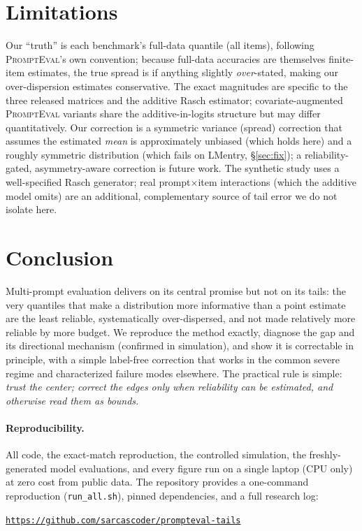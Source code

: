 \documentclass[11pt]{article}
\newcommand{\pe}{\textsc{PromptEval}}
\begin{document}
\section{Limitations}
Our ``truth'' is each benchmark's full-data quantile (all items), following \pe{}'s own
convention; because full-data accuracies are themselves finite-item estimates, the true spread
is if anything slightly \emph{over}-stated, making our over-dispersion estimates conservative.
The exact magnitudes are specific to the three released matrices and the additive Rasch
estimator; covariate-augmented \pe{} variants share the additive-in-logits structure but may
differ quantitatively. Our correction is a symmetric variance (spread) correction that assumes
the estimated \emph{mean} is approximately unbiased (which holds here) and a roughly symmetric
distribution (which fails on LMentry, \S\ref{sec:fix}); a reliability-gated, asymmetry-aware
correction is future work. The synthetic study uses a well-specified Rasch generator; real
prompt$\times$item interactions (which the additive model omits) are an additional,
complementary source of tail error we do not isolate here.

\section{Conclusion}
Multi-prompt evaluation delivers on its central promise but not on its tails: the very
quantiles that make a distribution more informative than a point estimate are the least
reliable, systematically over-dispersed, and not made relatively more reliable by more budget.
We reproduce the method exactly, diagnose the gap and its directional mechanism (confirmed in
simulation), and show it is correctable in principle, with a simple label-free correction that
works in the common severe regime and characterized failure modes elsewhere. The practical rule
is simple: \emph{trust the center; correct the edges only when reliability can be estimated,
and otherwise read them as bounds.}

\paragraph{Reproducibility.} All code, the exact-match reproduction, the controlled simulation,
the freshly-generated model evaluations, and every figure run on a single laptop (CPU only) at
zero cost from public data. The repository provides a one-command reproduction
(\texttt{run\_all.sh}), pinned dependencies, and a full research log:
\begin{center}\texttt{\url{https://github.com/sarcascoder/prompteval-tails}}\end{center}
\end{document}
